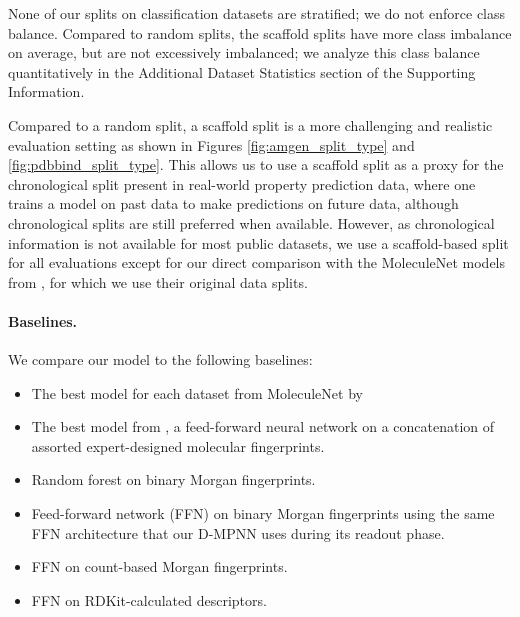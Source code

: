 \documentclass[journal=jcisd8,manuscript=article]{achemso}
\begin{document}
None of our splits on classification datasets are stratified; we do not enforce class balance. Compared to random splits, the scaffold splits have more class imbalance on average, but are not excessively imbalanced; we analyze this class balance quantitatively in the Additional Dataset Statistics section of the Supporting Information.

Compared to a random split, a scaffold split is a more challenging and realistic evaluation setting as shown in Figures \ref{fig:amgen_split_type} and \ref{fig:pdbbind_split_type}. This allows us to use a scaffold split as a proxy for the chronological split present in real-world property prediction data, where one trains a model on past data to make predictions on future data, although chronological splits are still preferred when available. However, as chronological information is not available for most public datasets, we use a scaffold-based split for all evaluations except for our direct comparison with the MoleculeNet models from \citeauthor{Wu_2018}\cite{Wu_2018}, for which we use their original data splits.

\paragraph{Baselines.} We compare our model to the following baselines:

\begin{itemize}
    \item The best model for each dataset from MoleculeNet by \citeauthor{Wu_2018}\cite{Wu_2018}
    \item The best model from \citeauthor{mayr2018chembl}\cite{mayr2018chembl}, a feed-forward neural network on a concatenation of assorted expert-designed molecular fingerprints.
    \item Random forest on binary Morgan fingerprints.
    \item Feed-forward network (FFN) on binary Morgan fingerprints using the same FFN architecture that our D-MPNN uses during its readout phase.
    \item FFN on count-based Morgan fingerprints.
    \item FFN on RDKit-calculated descriptors.
\end{itemize}
\end{document}
